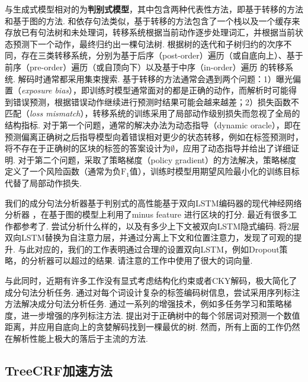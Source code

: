 与生成式模型相对的为\textbf{判别式模型}，其中包含两种代表性方法，即基于转移的方法和基于图的方法.
和依存句法类似，基于转移的方法包含了一个栈以及一个缓存来存放已有句法树和未处理词，转移系统根据当前动作逐步处理词汇，并根据当前状态预测下一个动作，最终归约出一棵句法树.
根据树的迭代和子树归约的次序不同，存在三类转移系统，分别为基于后序（post-order）遍历（或自底向上）、基于前序（pre-order）遍历（或自顶向下）以及基于中序（in-order）遍历 \citep{liu-zhang-2017-order}的转移系统.
解码时通常都采用集束搜索.
基于转移的方法通常会遇到两个问题：1）曝光偏置（\emph{exposure bias}），即训练时模型通常面对的都是正确的动作，而解析时可能得到错误预测，根据错误动作继续进行预测时结果可能会越来越差；2）损失函数不匹配（\emph{loss mismatch}），转移系统的训练采用了局部动作级别损失而忽视了全局的结构指标.
对于第一个问题，通常的解决办法为动态指导（dynamic oracle），即在预测偏离正确树之后指导模型向着错误相对更少的状态转移，例如在标签预测时，将不存在于正确树的区块的标签的答案设计为$\emptyset$，\citet{cross-huang-2016-span}应用了动态指导并给出了详细证明.
对于第二个问题，\citet{fried-klein-2018-policy}采取了策略梯度（policy gradient）的方法解决，策略梯度定义了一个风险函数（通常为负$\mathrm{F}_1$值），训练时模型用期望风险最小化的训练目标代替了局部动作损失.

我们的成分句法分析器基于判别式的高性能基于双向LSTM编码器的现代神经网络分析器 \citep{stern-etal-2017-minimal}，在基于图的模型上利用了minus feature \citep{cross-huang-2016-span}进行区块的打分.
最近有很多工作都参考了\citet{stern-etal-2017-minimal}.
\citet{gaddy-etal-2018-whats}尝试分析什么样的，以及有多少上下文被双向LSTM隐式编码.
\citet{kitaev-klein-2018-constituency}将2层双向LSTM替换为自注意力层，并通过分离上下文和位置注意力，发现了可观的提升.
与此对应的，我们的工作表明通过合理的设置双向LSTM，例如Dropout策略，\citet{stern-etal-2017-minimal}的分析器可以超过\citet{kitaev-klein-2018-constituency}的结果.
请注意\citet{kitaev-klein-2018-constituency}的工作中使用了很大的词向量.

与此同时，近期有许多工作没有显式考虑结构化约束或者CKY解码，极大简化了成分句法分析任务.
\citet{gomez-rodriguez-vilares-2018-constituent}通过对每个词设计复杂的标签编码树信息，尝试采用序列标注方法解决成分句法分析任务.
\citet{vilares-etal-2019-better}通过一系列的增强技术，例如多任务学习和策略梯度，进一步增强的序列标注方法.
\citet{shen-etal-2018-straight}提出对于正确树中的每个邻居词对预测一个数值距离，并应用自底向上的贪婪解码找到一棵最优的树.
然而，所有上面的工作仍然在解析性能上极大的落后于主流的方法.

\subsection{TreeCRF加速方法}


